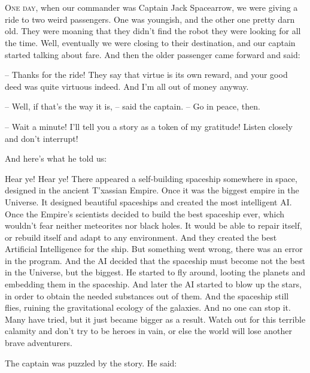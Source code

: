 \documentclass[ebook,twoside,final,openright]{memoir}
\begin{document}
\chapter{}
\par
\lettrine{O}{ne day,} when our commander was Captain Jack Spacearrow, we were giving a ride to two weird passengers. One was youngish, and the other one pretty darn old. They were moaning that they didn’t find the robot they were looking for all the time. Well, eventually we were closing to their destination, and our captain started talking about fare. And then the older passenger came forward and said: \par
\par
– Thanks for the ride! They say that virtue is its own reward, and your good deed was quite virtuous indeed. And I’m all out of money anyway.\par
– Well, if that’s the way it is, – said the captain. – Go in peace, then. \par
– Wait a minute! I'll tell you a story as a token of my gratitude! Listen closely and don’t interrupt! \par
 And here’s what he told us:\par
\par
Hear ye! Hear ye! There appeared a self-building spaceship somewhere in space, designed in the ancient T'xassian Empire. Once it was the biggest empire in the Universe. It designed beautiful spaceships and created the most intelligent AI. Once the Empire’s scientists decided to build the best spaceship ever, which wouldn’t fear neither meteorites nor black holes. It would be able to repair itself, or rebuild itself and adapt to any environment. And they created the best Artificial Intelligence for the ship. But something went wrong, there was an error in the program. And the AI decided that the spaceship must become not the best in the Universe, but the biggest. He started to fly around, looting the planets and embedding them in the spaceship. And later the AI started to blow up the stars, in order to obtain the needed substances out of them. And the spaceship still flies, ruining the gravitational ecology of the galaxies. And no one can stop it. Many have tried, but it just became bigger as a result. Watch out for this terrible calamity and don’t try to be heroes in vain, or else the world will lose another brave adventurers.\par
\par
The captain was puzzled by the story. He said:\par
\end{document}

